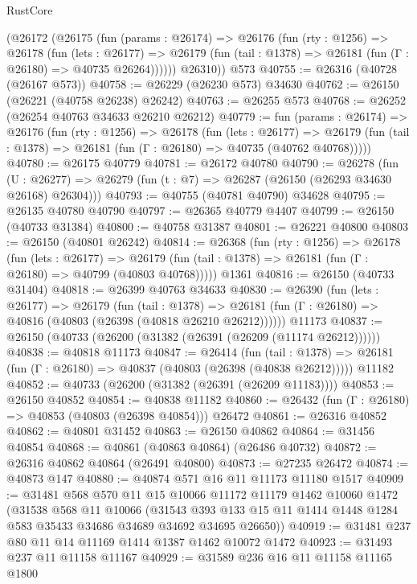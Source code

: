 \begin{lexlean}{RustCore}
\begin{coremodule}
      (@26172
        (@26175
          (fun (params : @26174) =>
          @26176
            (fun (rty : @1256) =>
            @26178
              (fun (lets : @26177) =>
              @26179 (fun (tail : @1378) => @26181 (fun (Γ : @26180) => @40735 @26264))))))
        @26310))
    @573
@40755 := @26316 (@40728 (@26167 @573))
@40758 := @26229 (@26230 @573) @34630
@40762 := @26150 (@26221 (@40758 @26238) @26242)
@40763 := @26255 @573
@40768 := @26252 (@26254 @40763 @34633 @26210 @26212)
@40779 := fun (params : @26174) =>
  @26176
    (fun (rty : @1256) =>
    @26178
      (fun (lets : @26177) =>
      @26179 (fun (tail : @1378) => @26181 (fun (Γ : @26180) => @40735 (@40762 @40768)))))
@40780 := @26175 @40779
@40781 := @26172 @40780
@40790 := @26278
    (fun (U : @26277) => @26279 (fun (t : @7) => @26287 (@26150 (@26293 @34630 @26168) @26304)))
@40793 := @40755 (@40781 @40790) @34628
@40795 := @26135 @40780 @40790
@40797 := @26365 @40779 @4407
@40799 := @26150 (@40733 @31384)
@40800 := @40758 @31387
@40801 := @26221 @40800
@40803 := @26150 (@40801 @26242)
@40814 := @26368
    (fun (rty : @1256) =>
    @26178
      (fun (lets : @26177) =>
      @26179 (fun (tail : @1378) => @26181 (fun (Γ : @26180) => @40799 (@40803 @40768)))))
    @1361
@40816 := @26150 (@40733 @31404)
@40818 := @26399 @40763 @34633
@40830 := @26390
    (fun (lets : @26177) =>
    @26179
      (fun (tail : @1378) =>
      @26181 (fun (Γ : @26180) => @40816 (@40803 (@26398 (@40818 @26210 @26212))))))
    @11173
@40837 := @26150 (@40733 (@26200 (@31382 (@26391 (@26209 (@11174 @26212))))))
@40838 := @40818 @11173
@40847 := @26414
    (fun (tail : @1378) => @26181 (fun (Γ : @26180) => @40837 (@40803 (@26398 (@40838 @26212)))))
    @11182
@40852 := @40733 (@26200 (@31382 (@26391 (@26209 @11183))))
@40853 := @26150 @40852
@40854 := @40838 @11182
@40860 := @26432 (fun (Γ : @26180) => @40853 (@40803 (@26398 @40854))) @26472
@40861 := @26316 @40852
@40862 := @40801 @31452
@40863 := @26150 @40862
@40864 := @31456 @40854
@40868 := @40861 (@40863 @40864) (@26486 @40732)
@40872 := @26316 @40862 @40864 (@26491 @40800)
@40873 := @27235 @26472
@40874 := @40873 @147
@40880 := @40874 @571 @16 @11 @11173 @11180 @1517
@40909 := @31481
    @568
    @570
    @11
    @15
    @10066
    @11172
    @11179
    @1462
    @10060
    @1472
    (@31538
      @568
      @11
      @10066
      (@31543 @393 @133 @15 @11 @1414 @1448 @1284 @583 @35433 @34686 @34689 @34692 @34695 @26650))
@40919 := @31481 @237 @80 @11 @14 @11169 @1414 @1387 @1462 @10072 @1472
@40923 := @31493 @237 @11 @11158 @11167
@40929 := @31589 @236 @16 @11 @11158 @11165 @1800

\end{coremodule}
\end{lexlean}
